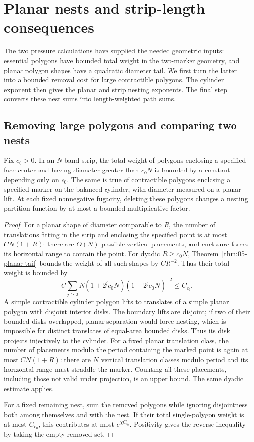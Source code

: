 \section{Planar nests and strip-length consequences}
\label{sec:05-nesting}

The two pressure calculations have supplied the needed geometric inputs:
essential polygons have bounded total weight in the two-marker geometry,
and planar polygon shapes have a quadratic diameter tail. We first turn
the latter into a bounded removal cost for large contractible polygons.
The cylinder exponent then gives the planar and strip nesting exponents.
The final step converts these nest sums into length-weighted path sums.

\subsection{Removing large polygons and comparing two nests}

\begin{lemma}
\label{lem:05-macroscopic-removal}
Fix \(c_0>0\). In an \(N\)-band strip, the total weight of polygons enclosing a specified face center and having diameter greater than \(c_0N\) is bounded by a constant depending only on \(c_0\). The same is true of contractible polygons enclosing a specified marker on the balanced cylinder, with diameter measured on a planar lift. At each fixed nonnegative fugacity, deleting these polygons changes a nesting partition function by at most a bounded multiplicative factor.
\end{lemma}

\begin{proof}
For a planar shape of diameter comparable to \(R\), the number of translations fitting in the strip and enclosing the specified point is at most \(CN(1+R)\): there are \(O(N)\) possible vertical placements, and enclosure forces its horizontal range to contain the point. For dyadic \(R\ge c_0N\), Theorem~\ref{thm:05-planar-tail} bounds the weight of all such shapes by \(CR^{-2}\). Thus their total weight is bounded by
\[
 C\sum_{j\ge0}N(1+2^jc_0N)(1+2^jc_0N)^{-2}
 \le C_{c_0}.
\]
A simple contractible cylinder polygon lifts to translates of a simple planar polygon with disjoint interior disks. The boundary lifts are disjoint; if two of their bounded disks overlapped, planar separation would force nesting, which is impossible for distinct translates of equal-area bounded disks. Thus its disk projects injectively to the cylinder. For a fixed planar translation class, the number of placements modulo the period containing the marked point is again at most \(CN(1+R)\): there are \(N\) vertical translation classes modulo period and its horizontal range must straddle the marker. Counting all these placements, including those not valid under projection, is an upper bound. The same dyadic estimate applies.

For a fixed remaining nest, sum the removed polygons while ignoring disjointness both among themselves and with the nest. If their total single-polygon weight is at most \(C_{c_0}\), this contributes at most \(e^{\chi C_{c_0}}\). Positivity gives the reverse inequality by taking the empty removed set.
\end{proof}

